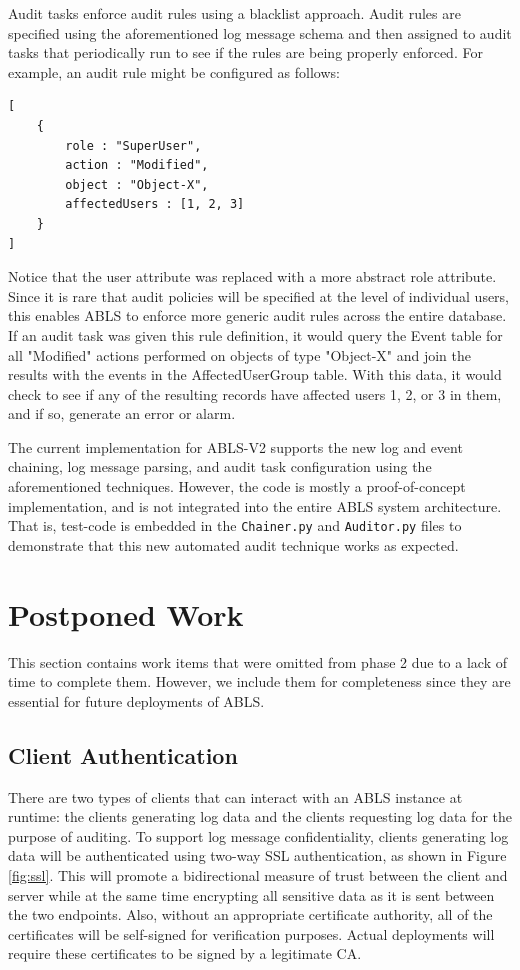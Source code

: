 \documentclass{sig-alternate}
\begin{document}
Audit tasks enforce audit rules using a blacklist approach. Audit rules are specified using the aforementioned 
log message schema and then assigned to audit tasks that periodically run to see if the rules are being properly enforced.
For example, an audit rule might be configured as follows:

\begin{lstlisting}
[
    {
        role : "SuperUser",
        action : "Modified",
        object : "Object-X",
        affectedUsers : [1, 2, 3]
    }
]
\end{lstlisting}

Notice that the user attribute was replaced with a more abstract role attribute. Since it is rare that audit policies will
be specified at the level of individual users, this enables ABLS to enforce more generic audit rules across the 
entire database. If an audit task was given this rule definition, it would query the Event table for all
"Modified" actions performed on objects of type "Object-X" and join the results with the events in the AffectedUserGroup
table. With this data, it would check to see if any of the resulting records have affected users 1, 2, or 3 in them, and if
so, generate an error or alarm. 

The current implementation for ABLS-V2 supports the new log and event chaining, log message parsing, and 
audit task configuration using the aforementioned techniques. However, the code is mostly a proof-of-concept 
implementation, and is not integrated into the entire ABLS system architecture. That is, test-code is embedded
in the {\tt Chainer.py} and {\tt Auditor.py} files to demonstrate that this new automated audit technique works as 
expected.

\section{Postponed Work}
This section contains work items that were omitted from phase 2 due to a lack of time to complete them. However, we include them for completeness since they are essential for future deployments of ABLS.

\subsection{Client Authentication}
\label{sec:auth}
There are two types of clients that can interact with an ABLS instance at runtime: the clients generating log data and the
clients requesting log data for the purpose of auditing. To support log message confidentiality, clients generating 
log data will be authenticated using two-way SSL authentication, as shown in Figure \ref{fig:ssl}. This will 
promote a bidirectional measure of trust between the client and server while at the same time encrypting 
all sensitive data as it is sent between the two endpoints. Also, without an appropriate certificate authority, all
of the certificates will be self-signed for verification purposes. Actual deployments will require these certificates
to be signed by a legitimate CA.
\end{document}
